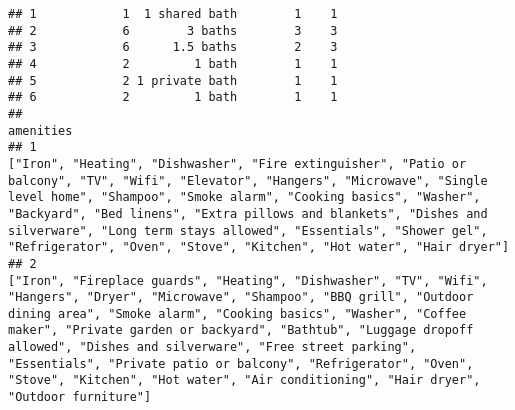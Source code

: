 \documentclass[
]{article}
\begin{document}
\begin{verbatim}
## 1            1  1 shared bath        1    1
## 2            6        3 baths        3    3
## 3            6      1.5 baths        2    3
## 4            2         1 bath        1    1
## 5            2 1 private bath        1    1
## 6            2         1 bath        1    1
##                                                                                                                                                                                                                                                                                                                                                                                                                                                                                                                                                                                                                                                                                                                                                                                                                                                                                                                                                                                                                                     amenities
## 1                                                                                                                                                                                                                                                                                                                                                                                                                                                                                                                                                                                                                      ["Iron", "Heating", "Dishwasher", "Fire extinguisher", "Patio or balcony", "TV", "Wifi", "Elevator", "Hangers", "Microwave", "Single level home", "Shampoo", "Smoke alarm", "Cooking basics", "Washer", "Backyard", "Bed linens", "Extra pillows and blankets", "Dishes and silverware", "Long term stays allowed", "Essentials", "Shower gel", "Refrigerator", "Oven", "Stove", "Kitchen", "Hot water", "Hair dryer"]
## 2                                                                                                                                                                                                                                                                                                                                                                                                                                                                                                                                                ["Iron", "Fireplace guards", "Heating", "Dishwasher", "TV", "Wifi", "Hangers", "Dryer", "Microwave", "Shampoo", "BBQ grill", "Outdoor dining area", "Smoke alarm", "Cooking basics", "Washer", "Coffee maker", "Private garden or backyard", "Bathtub", "Luggage dropoff allowed", "Dishes and silverware", "Free street parking", "Essentials", "Private patio or balcony", "Refrigerator", "Oven", "Stove", "Kitchen", "Hot water", "Air conditioning", "Hair dryer", "Outdoor furniture"]

\end{verbatim}
\end{document}
